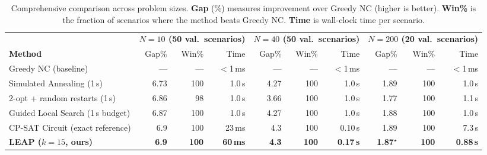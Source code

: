 \documentclass[conference]{IEEEtran}
\begin{document}
\begin{table}[t]
\caption{Comprehensive comparison across problem sizes. \textbf{Gap} (\%) measures improvement over Greedy NC (higher is better). \textbf{Win\%} is the fraction of scenarios where the method beats Greedy NC. \textbf{Time} is wall-clock time per scenario.}
\label{tab:baselines}
\centering
\begin{tabular}{@{}l rrr rrr rrr@{}}
\toprule
& \multicolumn{3}{c}{\textbf{$N{=}10$ (50 val.\ scenarios)}} & \multicolumn{3}{c}{\textbf{$N{=}40$ (50 val.\ scenarios)}} & \multicolumn{3}{c}{\textbf{$N{=}200$ (20 val.\ scenarios)}} \\
\cmidrule(lr){2-4} \cmidrule(lr){5-7} \cmidrule(lr){8-10}
\textbf{Method} & Gap\% & Win\% & Time & Gap\% & Win\% & Time & Gap\% & Win\% & Time \\
\midrule
Greedy NC (baseline)                                       & ---   & ---  & $<$1\,ms & ---   & ---  & $<$1\,ms & ---           & ---  & $<$1\,ms \\
Simulated Annealing (1\,s)                                 & 6.73  & 100  & 1.0\,s   & 4.27  & 100  & 1.0\,s   & 1.89          & 100  & 1.0\,s \\
2-opt + random restarts (1\,s)                             & 6.86  &  98  & 1.0\,s   & 3.66  & 100  & 1.0\,s   & 1.77          & 100  & 1.1\,s \\
Guided Local Search (1\,s budget)                          & 6.87  & 100  & 1.0\,s   & 4.27  & 100  & 1.0\,s   & 1.88          & 100  & 1.0\,s \\
CP-SAT Circuit (exact reference)                           & 6.9   & 100  & 23\,ms   & 4.3   & 100  & 0.10\,s  & 1.89          & 100  & 7.3\,s \\
\textbf{LEAP ($k{=}15$, ours)}                             & \textbf{6.9} & \textbf{100} & \textbf{60\,ms} & \textbf{4.3} & \textbf{100} & \textbf{0.17\,s} & \textbf{1.87}$^\star$ & \textbf{100} & \textbf{0.88\,s} \\
\bottomrule
\end{tabular}


\end{table}
\end{document}
